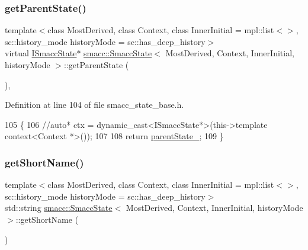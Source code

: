 \subsubsection{\texorpdfstring{get\+Parent\+State()}{getParentState()}}
{\footnotesize\ttfamily template$<$class Most\+Derived, class Context, class Inner\+Initial = mpl\+::list$<$$>$, sc\+::history\+\_\+mode history\+Mode = sc\+::has\+\_\+deep\+\_\+history$>$ \\
virtual \hyperlink{classsmacc_1_1ISmaccState}{I\+Smacc\+State}$\ast$ \hyperlink{classsmacc_1_1SmaccState}{smacc\+::\+Smacc\+State}$<$ Most\+Derived, Context, Inner\+Initial, history\+Mode $>$\+::get\+Parent\+State (\begin{DoxyParamCaption}{ }\end{DoxyParamCaption})\hspace{0.3cm}{\ttfamily [inline]}, {\ttfamily [virtual]}}



Definition at line 104 of file smacc\+\_\+state\+\_\+base.\+h.


\begin{DoxyCode}
105   \{
106     \textcolor{comment}{//auto* ctx = dynamic\_cast<ISmaccState*>(this->template context<Context *>());}
107 
108     \textcolor{keywordflow}{return} \hyperlink{classsmacc_1_1ISmaccState_ad61db41d8d06a836e7d1dac7767f5695}{parentState\_};
109   \}
\end{DoxyCode}
\mbox{\label{classsmacc_1_1SmaccState_a4db028a85244653e48957d2b3371413d}} 
\subsubsection{\texorpdfstring{get\+Short\+Name()}{getShortName()}}
{\footnotesize\ttfamily template$<$class Most\+Derived, class Context, class Inner\+Initial = mpl\+::list$<$$>$, sc\+::history\+\_\+mode history\+Mode = sc\+::has\+\_\+deep\+\_\+history$>$ \\
std\+::string \hyperlink{classsmacc_1_1SmaccState}{smacc\+::\+Smacc\+State}$<$ Most\+Derived, Context, Inner\+Initial, history\+Mode $>$\+::get\+Short\+Name (\begin{DoxyParamCaption}{ }\end{DoxyParamCaption})\hspace{0.3cm}{\ttfamily [inline]}}



